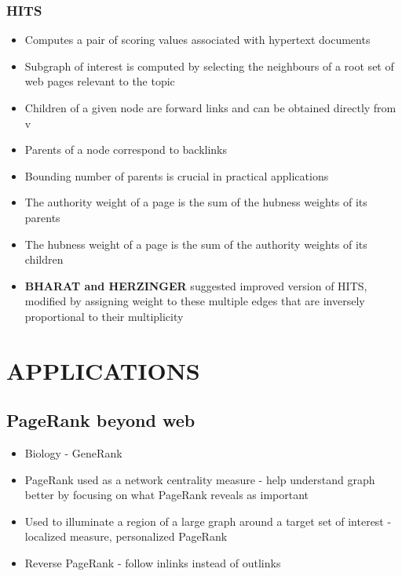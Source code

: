 \documentclass[11pt]{report}
\begin{document}
\subsection{HITS}
\begin{itemize}
\item Computes a pair of scoring values associated with hypertext documents
\item Subgraph of interest is computed by selecting the neighbours of a root set of web pages relevant to the topic
\item Children of a given node are forward links and can be obtained directly from v
\item Parents of a node correspond to backlinks
\item Bounding number of parents is crucial in practical applications
\item The authority weight of a page is the sum of the hubness weights of its parents
\item The hubness weight of a page is the sum of the authority weights of its children
\item \textbf{BHARAT and HERZINGER} suggested improved version of HITS, modified by assigning weight to these multiple edges that are inversely proportional to their multiplicity
\end{itemize}
\chapter{APPLICATIONS}
\section{PageRank beyond web}
\begin{itemize}
\item Biology - GeneRank
\item PageRank used as a network centrality measure - help understand graph better by focusing on what PageRank reveals as important
\item Used to illuminate a region of a large graph around a target set of interest - localized measure, personalized PageRank
\item Reverse PageRank - follow inlinks instead of outlinks
\end{itemize}
\end{document}
